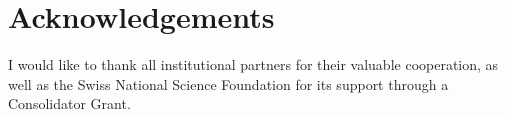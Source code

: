 \documentclass[output=paper]{langsci/langscibook}
\begin{document}
\section*{Acknowledgements} 
I would like to thank all institutional partners for their valuable cooperation, as well as the Swiss National Science Foundation for its support through a Consolidator Grant.
  
  
\sloppy
\printbibliography[heading=subbibliography,notkeyword=this] 
\end{document}
